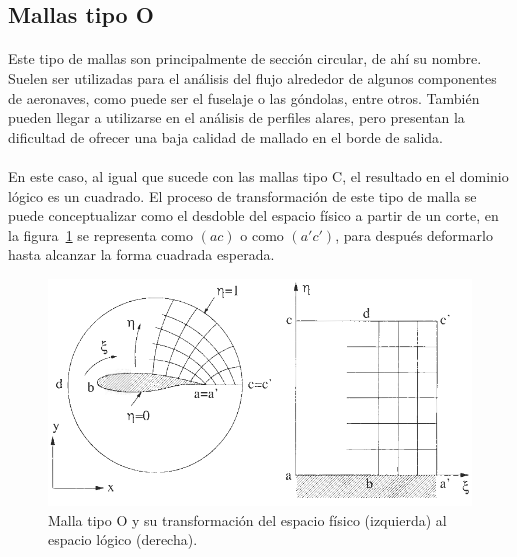 \documentclass[letterpaper, openright, 12pt]{book}
\begin{document}
    \subsection{Mallas tipo O}
    \paragraph*{}
    Este tipo de mallas son principalmente de sección circular, de ahí su
    nombre. Suelen ser utilizadas para el análisis del flujo alrededor de
    algunos componentes de aeronaves, como puede ser el fuselaje o las
    góndolas, entre otros.\cite{vladimir-grid} También pueden llegar a
    utilizarse en el análisis de perfiles alares, pero presentan la
    dificultad de ofrecer una baja calidad de mallado en el borde de
    salida.~\cite{blazek}\cite{best-practices-grid-generation}

    \paragraph*{}
    En este caso, al igual que sucede con las mallas tipo C, el resultado en
    el dominio lógico es un cuadrado. El proceso de transformación de este
    tipo de malla se puede conceptualizar como el desdoble del espacio
    físico a partir de un corte, en la figura~\ref{fig:malla-o} se
    representa como $(ac)$ o como $(a'c')$, para después deformarlo hasta
    alcanzar la forma cuadrada esperada.
    \begin{figure}[htbp!]
        \centering
            \includegraphics[keepaspectratio, width=170mm]{./Imagenes/malla-o}
            \captionsetup{justification=centering, margin=2cm}
            \caption[Malla tipo O]{Malla tipo O y su transformación del
            espacio físico (izquierda) al espacio lógico
            (derecha).~\cite{blazek}}
        \label{fig:malla-o}
    \end{figure}
\end{document}
